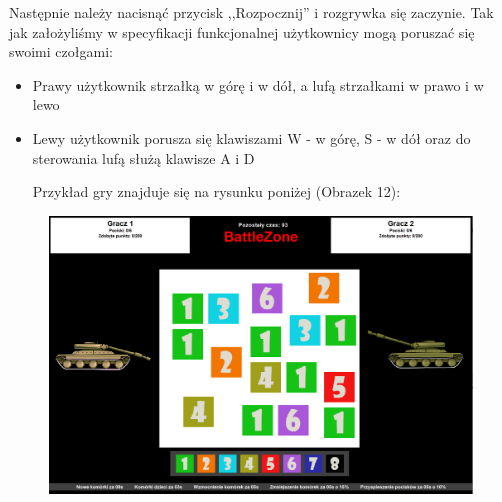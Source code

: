 \documentclass{article}
\begin{document}
Następnie należy nacisnąć przycisk ,,Rozpocznij'' i rozgrywka się zaczynie. Tak jak założyliśmy w specyfikacji funkcjonalnej użytkownicy mogą poruszać się swoimi czołgami:
\begin{itemize}
\item Prawy użytkownik strzałką w górę i w dół, a lufą strzałkami w prawo i w lewo
\item Lewy użytkownik porusza się klawiszami W - w górę, S - w dół oraz do sterowania lufą służą klawisze A i D 

\newpage Przykład gry znajduje się na rysunku poniżej (Obrazek 12):

\end{itemize}
\begin{figure} [hbt!]
    \centering
    \includegraphics[width=12cm]{rozgrywka.png}
\end{figure}
\end{document}
